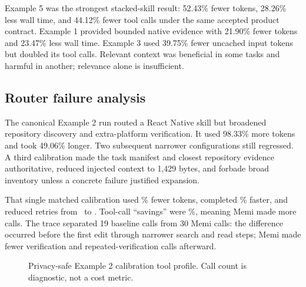 \documentclass[10pt,twocolumn]{article}
\begin{document}
Example 5 was the strongest stacked-skill result: 52.43\% fewer tokens,
28.26\% less wall time, and 44.12\% fewer tool calls under the same accepted
product contract. Example 1 provided bounded native evidence with 21.90\%
fewer tokens and 23.47\% less wall time. Example 3 used 39.75\% fewer uncached input tokens but
doubled its tool calls. Relevant context was beneficial in some tasks and
harmful in another; relevance alone is insufficient.

\subsection{Router failure analysis}

The canonical Example 2 run routed a React Native skill but broadened repository
discovery and extra-platform verification. It used 98.33\% more tokens and
took 49.06\% longer. Two subsequent narrower configurations still regressed.
A third calibration made the task manifest and closest repository evidence
authoritative, reduced injected context to 1,429 bytes, and forbade broad
inventory unless a concrete failure justified expansion.

That single matched calibration used \ExampleTwoCalibrationTokens\% fewer tokens,
completed \ExampleTwoCalibrationWall\% faster, and reduced retries from
\ExampleTwoBaselineRetries\ to \ExampleTwoMemiRetries. Tool-call ``savings'' were
\ExampleTwoCalibrationToolCalls\%, meaning Memi made more calls. The trace separated
19 baseline calls from 30 Memi calls: the difference occurred before the first
edit through narrower search and read steps; Memi made fewer verification and
repeated-verification calls afterward.

\begin{figure}[t]
\centering
{}
\caption{Privacy-safe Example 2 calibration tool profile. Call count is diagnostic,
not a cost metric.}
\label{fig:toolprofile}
\end{figure}
\end{document}
